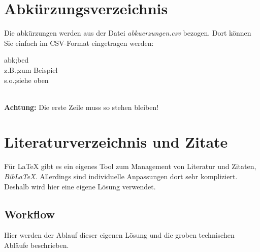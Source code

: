\documentclass[12pt]{article}
\begin{document}
\section{Abkürzungsverzeichnis}
Die abkürzungen werden aus der Datei \textit{abkuerzungen.csv} bezogen. Dort können Sie einfach im CSV-Format eingetragen werden:\\[6pt]
\colorbox{grayBack}{\begin{minipage}{4cm}
\vspace{5pt}
\hspace{5pt}abk;bed\\
\-\hspace{5pt}z.B.;zum Beispiel\\
\-\hspace{5pt}s.o.;siehe oben\vspace{5pt}
\end{minipage}
}\\[6pt]
\textbf{Achtung:} Die erste Zeile muss so stehen bleiben!

\section{Literaturverzeichnis und Zitate}
Für LaTeX gibt es ein eigenes Tool zum Management von Literatur und Zitaten, \textit{BibLaTeX}. Allerdings sind individuelle Anpassungen dort sehr kompliziert. Deshalb wird hier eine eigene Lösung verwendet.
\subsection{Workflow}
Hier werden der Ablauf dieser eigenen Lösung und die groben technischen Abläufe beschrieben.
\end{document}
